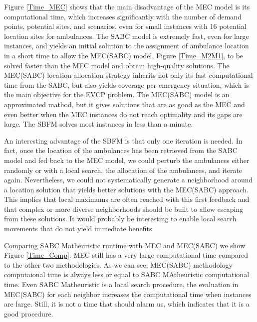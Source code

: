 Figure \ref{Time_MEC} shows that the main disadvantage of the MEC model is its computational time, which increases significantly with the number of demand points, potential sites, and scenarios, even for small instances with 16 potential location sites for ambulances. The SABC model is extremely fast, even for large instances, and yields an initial solution to the assignment of ambulance location in a short time to allow the MEC(SABC) model, Figure \ref{Time_M2M1}, to be solved faster than the MEC model and obtain high-quality solutions. The MEC(SABC) location-allocation strategy inherits not only its fast computational time from the SABC, but also yields coverage per emergency situation, which is the main objective for the EVCP problem. The MEC(SABC) model is an approximated mathod, but it gives solutions that are as good as the MEC and even better when the MEC instances do not reach optimality and its gaps are large. The SBFM solves most instances in less than a minute.  

An interesting advantage of the SBFM is that only one iteration is needed. In fact, once the location of the ambulances has been retrieved from the SABC model and fed back to the MEC model, we could perturb the ambulances either randomly or with a local search, the allocation of the ambulances, and iterate again. Nevertheless, we could not systematically generate a neighborhood around a location solution that yields better solutions with the MEC(SABC) approach. This implies that local maximums are often reached with this first feedback and that complex or more diverse neighborhoods should be built to allow escaping from these solutions. It would probably be interesting to enable local search movements that do not yield immediate benefits.  

Comparing SABC Matheuristic runtime with MEC and MEC(SABC) we show Figure \ref{Time_Comp}. MEC still has a very large computational time compared to the other two methodologies. As we can see, MEC(SABC) methodology computaional time is always less or equal to SABC MAtheuristic computational time. Even SABC Matheuristic is a local search procedure, the evaluation in MEC(SABC) for each neighbor increases the computational time when instances are large. Still, it is not a time that should alarm us, which indicates that it is a good procedure.


